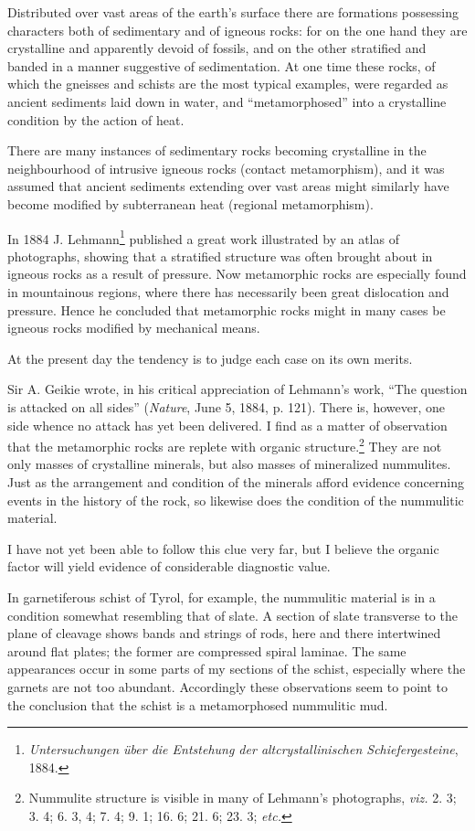 \documentclass[a4paper, 12pt, oneside, landscape]{article}
\begin{document}
Distributed over vast areas of the earth's surface there are formations possessing characters both of sedimentary and of igneous rocks: for on the one hand they are crystalline and apparently devoid of fossils, and on the other stratified and banded in a manner suggestive of sedimentation. At one time these rocks, of which the gneisses and schists are the most typical examples, were regarded as ancient sediments laid down in water, and ``metamorphosed'' into a crystalline condition by the action of heat.

There are many instances of sedimentary rocks becoming crystalline in the neighbourhood of intrusive igneous rocks (contact metamorphism), and it was assumed that ancient sediments extending over vast areas might similarly have become modified by subterranean heat (regional metamorphism).

In 1884 J. Lehmann\footnote{\emph{Untersuchungen über die Entstehung der altcrystallinischen Schiefergesteine}, 1884.} published a great work illustrated by an atlas of photographs, showing that a stratified structure was often brought about in igneous rocks as a result of pressure. Now metamorphic rocks are especially found in mountainous regions, where there has necessarily been great dislocation and pressure. Hence he concluded that metamorphic rocks might in many cases be igneous rocks modified by mechanical means.

At the present day the tendency is to judge each case on its own merits.

Sir A. Geikie wrote, in his critical appreciation of Lehmann's work, ``The question is attacked on all sides'' (\emph{Nature}, June 5, 1884, p. 121). There is, however, one side whence no attack has yet been delivered. I find as a matter of observation that the metamorphic rocks are replete with organic structure.\footnote{Nummulite structure is visible in many of Lehmann's photographs, \emph{viz.} 2. 3; 3. 4; 6. 3, 4; 7. 4; 9. 1; 16. 6; 21. 6; 23. 3; \emph{etc.}} They are not only masses of crystalline minerals, but also masses of mineralized nummulites. Just as the arrangement and condition of the minerals afford evidence concerning events in the history of the rock, so likewise does the condition of the nummulitic material.

I have not yet been able to follow this clue very far, but I believe the organic factor will yield evidence of considerable diagnostic value.

In garnetiferous schist of Tyrol, for example, the nummulitic material is in a condition somewhat resembling that of slate. A section of slate transverse to the plane of cleavage shows bands and strings of rods, here and there intertwined around flat plates; the former are compressed spiral laminae. The same appearances occur in some parts of my sections of the schist, especially where the garnets are not too abundant. Accordingly these observations seem to point to the conclusion that the schist is a metamorphosed nummulitic mud.
\end{document}
